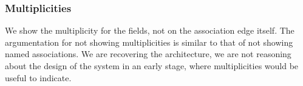 	\subsubsection{Multiplicities}
		We show the multiplicity for the fields, not on the association edge itself. 
		The argumentation for not showing multiplicities is similar to that of not showing named associations.
		We are recovering the architecture, we are not reasoning about the design of the system in an early stage, 
		where multiplicities would be useful to indicate.
